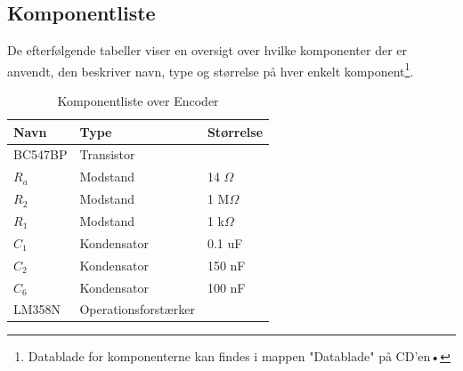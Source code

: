 \newpage
\subsection{Komponentliste}

De efterfølgende tabeller viser en oversigt over hvilke komponenter der er anvendt, den beskriver navn, type og størrelse på hver enkelt komponent\footnote{Datablade for komponenterne kan findes i mappen "Datablade" på CD'en•}. 


\begin{table}[htbp] \centering
\caption{Komponentliste over Encoder}
\begin{small}
    \begin{tabular}{|p{2cm}|p{4cm}|p{2cm}|}
    \hline
    \textbf{Navn}    & \textbf{Type}                 & \textbf{Størrelse} \\ \hline
    BC547BP    & Transistor           & ~         \\ \hline
    $R_a$      & Modstand             & 14 $\Omega$    \\ \hline
    $R_2$      & Modstand             & 1 M$\Omega$    \\ \hline
    $R_1$      & Modstand             & 1 k$\Omega$    \\ \hline
    $C_1$      & Kondensator          & 0.1 uF    \\ \hline
    $C_2$      & Kondensator          & 150 nF    \\ \hline
    $C_6$      & Kondensator           & 100 nF    \\ \hline
    LM358N     & Operationsforstærker & ~         \\ \hline
    \end{tabular}
   \end{small}
\label{table:Komponentliste encoder}
\end{table}

